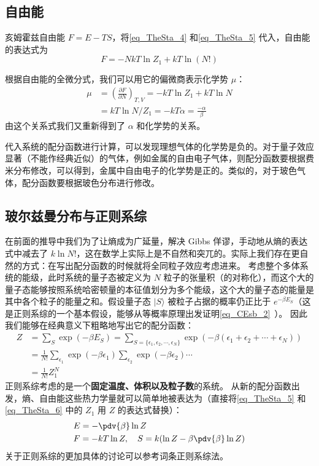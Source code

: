 \subsection{自由能}
亥姆霍兹自由能 $F=E-TS$，将\autoref{eq_TheSta_4} 和\autoref{eq_TheSta_5} 代入，自由能的表达式为
\begin{equation}\label{eq_TheSta_6}
F=-NkT\ln Z_1+kT\ln(N!)
\end{equation}

根据自由能的全微分式，我们可以用它的偏微商表示化学势 $\mu$：
\begin{equation}
\begin{aligned}
\mu&=\left(\frac{\partial F}{\partial N}\right)_{T,V}=-kT\ln Z_1+kT\ln N\\
&=kT\ln N/Z_1=-kT\alpha=\frac{-\alpha}{\beta}
\end{aligned}
\end{equation}
由这个关系式我们又重新得到了 $\alpha$ 和化学势的关系。

代入系统的配分函数进行计算，可以发现理想气体的化学势是负的。对于量子效应显著（不能作经典近似）的气体，例如金属的自由电子气体，则配分函数要根据费米分布修改，可以得到，金属中自由电子的化学势是正的。类似的，对于玻色气体，配分函数要根据玻色分布进行修改。

\subsection{玻尔兹曼分布与正则系综}
在前面的推导中我们为了让熵成为广延量，解决 Gibbs 佯谬，手动地从熵的表达式中减去了 $k\ln N!$，这在数学上实际上是不自然和突兀的。实际上我们存在更自然的方式：在写出配分函数的时候就将全同粒子效应考虑进来。
考虑整个多体系统的能级，此时系统的量子态被定义为 $N$ 粒子的张量积（的对称化），而这个大的量子态能够按照系统哈密顿量的本征值划分为多个能级，这个大的量子态的能量是其中各个粒子的能量之和。假设量子态 $|S\rangle$ 被粒子占据的概率仍正比于 $e^{-\beta E_S}$（这是正则系综的一个基本假设，能够从等概率原理出发证明\autoref{eq_CEsb_2}~）。 因此我们能够在经典意义下粗略地写出它的配分函数：
\begin{equation}
\begin{aligned}
Z&=\sum_{S} \exp(-\beta E_S)=\sum_{S=\{\epsilon_1,\epsilon_2,\cdots,\epsilon_N\}}\exp(-\beta(\epsilon_1+\epsilon_2+\cdots+\epsilon_N))\\
&=\frac{1}{N!} \sum_{\epsilon_1}\exp(-\beta \epsilon_1) \sum_{\epsilon_2}\exp(-\beta\epsilon_2)\cdots\\
&=\frac{1}{N!}Z_1^N
\end{aligned}
\end{equation}
正则系综考虑的是一个\textbf{固定温度、体积以及粒子数}的系统。
从新的配分函数出发，熵、自由能这些热力学量就可以简单地被表达为（直接将\autoref{eq_TheSta_5} 和 \autoref{eq_TheSta_6} 中的 $Z_1$ 用 $Z$ 的表达式替换）：
\begin{equation}
\begin{aligned}
&E=-\pdv{\beta}\ln Z\\
&F=-kT\ln Z,\quad S=k(\ln Z-\beta \pdv{\beta}\ln Z)
\end{aligned}
\end{equation}
关于正则系综的更加具体的讨论可以参考词条正则系综法。